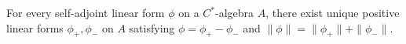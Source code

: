 For every self-adjoint linear form $\phi$ on a $C^*$-algebra $A$, there exist unique positive linear forms $\phi_+, \phi_-$ on $A$ satisfying $\phi = \phi_+ - \phi_-$ and $\|\phi\| = \|\phi_+\| + \|\phi_-\|$.
